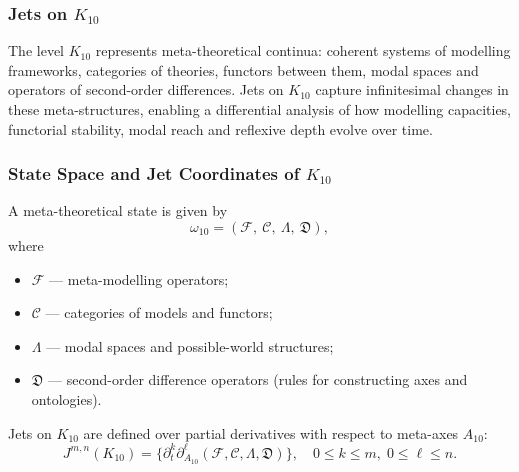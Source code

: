
\subsubsection{Jets on $K_{10}$}
\label{sec:jets-k10}

The level $K_{10}$ represents meta-theoretical continua: coherent systems
of modelling frameworks, categories of theories, functors between them,
modal spaces and operators of second-order differences. Jets on $K_{10}$
capture infinitesimal changes in these meta-structures, enabling a
differential analysis of how modelling capacities, functorial stability,
modal reach and reflexive depth evolve over time.


\subsubsection{State Space and Jet Coordinates of $K_{10}$}

A meta-theoretical state is given by
\[
\omega_{10}
=
(\mathcal{F},\ \mathcal{C},\ \Lambda,\ \mathfrak{D}),
\]
where
\begin{itemize}
    \item $\mathcal{F}$ — meta-modelling operators;
    \item $\mathcal{C}$ — categories of models and functors;
    \item $\Lambda$ — modal spaces and possible-world structures;
    \item $\mathfrak{D}$ — second-order difference operators
          (rules for constructing axes and ontologies).
\end{itemize}

Jets on $K_{10}$ are defined over partial derivatives with respect to
meta-axes $A_{10}$:
\[
J^{m,n}(K_{10}) =
\{\partial_t^k \partial_{A_{10}}^\ell
(\mathcal{F},\mathcal{C},\Lambda,\mathfrak{D})
\},
\quad
0\le k\le m,\;
0\le\ell\le n.
\]



